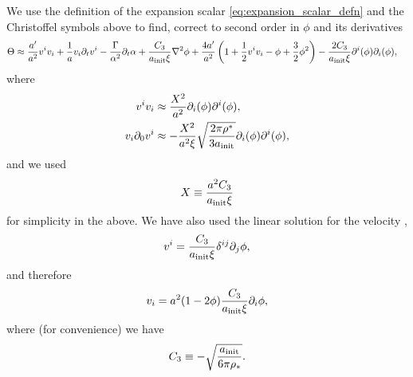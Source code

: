 \documentclass[a4paper]{article}
\newcommand{\pd}{\partial}
\begin{document}
We use the definition of the expansion scalar \eqref{eq:expansion_scalar_defn} and the Christoffel symbols above to find, correct to second order in $\phi$ and its derivatives
\begin{align}
		\Theta  &\approx \frac{a'}{a^2} v^i v_i + \frac{1}{a} v_i \pd_t v^i - \frac{\Gamma}{\alpha^2}\pd_t\alpha + \frac{C_3}{a_{\rm init}\xi} \nabla^2 \phi + \frac{4a'}{a^2} \left(1 + \frac{1}{2}v^iv_i - \phi + \frac{3}{2}\phi^2\right) - \frac{2C_3}{a_{\rm init}\xi} \pd^i(\phi) \pd_i (\phi),
\end{align}
where
\begin{align}
	v^i v_i &\approx \frac{X^2}{a^2} \pd_i(\phi)\pd^i(\phi), \\
	v_i \pd_0 v^i &\approx  -\frac{X^2}{a^2 \xi}\sqrt{\frac{2\pi\rho^*}{3a_{\rm init}}} \pd_i(\phi)\pd^i(\phi),
\end{align}
and we used
\begin{equation}
	X \equiv \frac{a^2C_3}{a_{\rm init}\xi}
\end{equation}
for simplicity in the above. We have also used the linear solution for the velocity \citep[see][]{macpherson2019c},
\begin{equation}
	v^i = \frac{C_3}{a_{\rm init}\xi} \delta^{ij}\pd_j \phi,
\end{equation}
and therefore
\begin{equation}
	v_i = a^2(1-2\phi)\frac{C_3}{a_{\rm init}\xi}\pd_i \phi,
\end{equation}
where (for convenience) we have
\begin{equation}
	C_3 \equiv - \sqrt{\frac{a_{\rm init}}{6 \pi \rho_*}}.
\end{equation}
\end{document}
